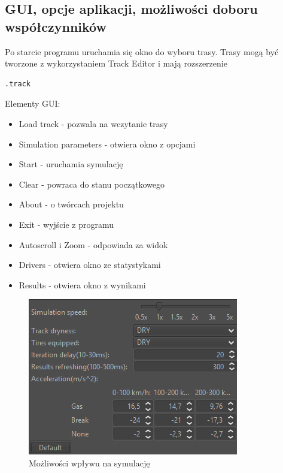 \documentclass{article}
\begin{document}




\subsection{GUI, opcje aplikacji, możliwości doboru współczynników}
Po starcie programu uruchamia się okno do wyboru trasy. Trasy mogą być tworzone z wykorzystaniem Track Editor i mają rozszerzenie \begin{verbatim}
.track
\end{verbatim}

Elementy GUI:
\begin{itemize}
\item Load track - pozwala na wczytanie trasy
\item Simulation parameters - otwiera okno z opcjami
\item Start - uruchamia symulację
\item Clear - powraca do stanu początkowego
\item About - o twórcach projektu
\item Exit - wyjście z programu
\item Autoscroll i Zoom - odpowiada za widok	
\item Drivers - otwiera okno ze statystykami
\item Results - otwiera okno z wynikami
\end{itemize}

\begin{figure}[h]
\begin{center}
\includegraphics[scale=0.8]{options.png}
\caption{Możliwości wpływu na symulację}
\end{center}
\end{figure}
\end{document}
